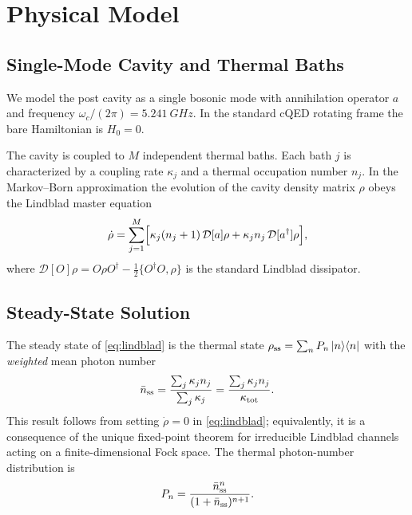 \documentclass[11pt,a4paper]{article}
\newcommand{\nbar}{\bar{n}}
\newcommand{\kappat}{\kappa_{\rm tot}}
\newcommand{\nss}{\nbar_{\rm ss}}
\newcommand{\Daq}{\mathcal{D}[a]}
\newcommand{\Dadag}{\mathcal{D}[a^\dagger]}
\begin{document}
\section{Physical Model}
\label{sec:model}

\subsection{Single-Mode Cavity and Thermal Baths}
\label{sec:cavity}

We model the post cavity as a single bosonic mode with annihilation operator
$a$ and frequency $\omega_c/(2\pi) = \SI{5.241}{GHz}$.
In the standard cQED rotating frame the bare Hamiltonian is $H_0 = 0$.

The cavity is coupled to $M$ independent thermal baths.  Each bath $j$ is
characterized by a coupling rate $\kappa_j$ and a thermal occupation number
$n_j$.  In the Markov--Born approximation the evolution of the cavity density
matrix $\rho$ obeys the Lindblad master equation
\begin{equation}
  \dot\rho
  = \sum_{j=1}^{M}
    \Bigl[
      \kappa_j(n_j+1)\,\Daq\rho
      + \kappa_j n_j\,\Dadag\rho
    \Bigr],
  \label{eq:lindblad}
\end{equation}
where $\mathcal{D}[O]\rho = O\rho O^\dagger - \tfrac{1}{2}\{O^\dagger O,\rho\}$
is the standard Lindblad dissipator.

\subsection{Steady-State Solution}
\label{sec:ss}

The steady state of \cref{eq:lindblad} is the thermal state
$\rho_{\rm ss} = \sum_n P_n \ket{n}\!\bra{n}$
with the \emph{weighted} mean photon number
\begin{equation}
  \nss = \frac{\sum_j \kappa_j n_j}{\sum_j \kappa_j}
       = \frac{\sum_j \kappa_j n_j}{\kappat}.
  \label{eq:nss}
\end{equation}
This result follows from setting $\dot\rho = 0$ in \cref{eq:lindblad};
equivalently, it is a consequence of the unique fixed-point theorem for
irreducible Lindblad channels acting on a finite-dimensional Fock space.
The thermal photon-number distribution is
\begin{equation}
  P_n = \frac{\nss^n}{(1+\nss)^{n+1}}.
  \label{eq:pn}
\end{equation}
\end{document}
